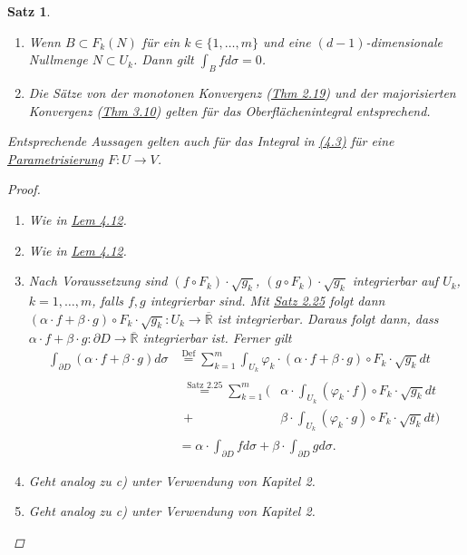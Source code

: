 \documentclass[a4paper]{scrreprt}
\newcommand{\R}{\mathbb{R}}
\newcommand{\Rq}{\overline{\R}}
\newcommand{\jlabel}[1]{\label{j_#1}}
\newcommand{\jshortlink}[1]{\jhyperref{#1}{\text{#1}}}
\newcommand{\jhyperref}[2]{\hyperref[j_#1]{#2}}
\newcommand{\jlink}[1]{\jhyperref{#1}{#1}}
\newcommand{\jabb}[3]{ #1: #2 \rightarrow #3 }
\theoremstyle{plain}
\newtheorem{satz}[thm]{Satz}
\theoremstyle{definition}
\begin{document}
{{{{\begin{satz}
\begin{enumerate}
        \item
            \jlabel{Satz 4.14h)}
            Wenn $B\subset F_k(N)$ für ein $k\in \{1,\dots,m\}$ und eine $(d-1)$-dimensionale Nullmenge $N\subset U_k$. Dann gilt $\int_B f d\sigma = 0$.
        \item
            \jlabel{Satz 4.14i)}
            Die Sätze von der monotonen Konvergenz (\jlink{Thm 2.19}) und der majorisierten Konvergenz (\jlink{Thm 3.10}) gelten für das Oberflächenintegral entsprechend.
    \end{enumerate}
    Entsprechende Aussagen gelten auch für das Integral in \jlink{(4.3)} für eine \jlink{Parametrisierung} $\jabb{F}{U}{V}$.
    \begin{proof}
        \begin{enumerate}
            \item Wie in \jlink{Lem 4.12}.
            \item Wie in \jlink{Lem 4.12}.
            \item
                Nach Voraussetzung sind $(f\circ F_k)\cdot \sqrt{g_k}$, $(g\circ F_k)\cdot \sqrt{g_k}$ integrierbar auf $U_k$, $k=1,\dots,m$, falls $f,g$ integrierbar sind. Mit \jlink{Satz 2.25} folgt dann $\jabb{(\alpha\cdot f + \beta\cdot g)\circ F_k\cdot \sqrt{g_k}}{U_k}{\Rq}$ ist integrierbar. Daraus folgt dann, dass $\jabb{\alpha\cdot f + \beta\cdot g}{\partial D}{\Rq}$ integrierbar ist. Ferner gilt
                \[
                    \begin{split}
                        \int_{\partial D} (\alpha\cdot f + \beta\cdot g) d\sigma &\overset{\text{Def}}{=} \sum_{k=1}^m \int_{U_k} \varphi_k\cdot(\alpha\cdot f + \beta\cdot g)\circ F_k \cdot \sqrt{g_k} dt\\
                        &\begin{split} 
                            \overset{\jshortlink{Satz 2.25}}{=}\sum_{k=1}^m (&\alpha\cdot \int_{U_k}(\varphi_k\cdot f)\circ F_k\cdot \sqrt{g_k}dt\\
                            + &\beta\cdot \int_{U_k}(\varphi_k\cdot g)\circ F_k\cdot \sqrt{g_k} dt  )
                        \end{split}\\
                        &=\alpha\cdot \int_{\partial D} f d\sigma + \beta \cdot \int_{\partial D} g d\sigma.
                    \end{split}
                \]
            \item Geht analog zu c) unter Verwendung von Kapitel 2.
            \item Geht analog zu c) unter Verwendung von Kapitel 2.
            

\end{enumerate}
\end{proof}
\end{satz}}}}}
\end{document}
